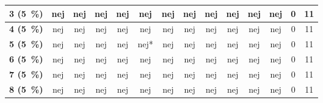 \begin{longtable} {l|c|c|c|c|c|c|c|c|c|c|c|c|c}
\cellcolor[HTML]{C0C0C0}\textbf{3   (5~\%)}	 & \cellcolor[HTML]{ECF4FF} nej	& \cellcolor[HTML]{ECF4FF}nej &	\cellcolor[HTML]{ECF4FF}nej &\cellcolor[HTML]{ECF4FF} nej	& \cellcolor[HTML]{ECF4FF}nej &	\cellcolor[HTML]{ECF4FF}nej	& \cellcolor[HTML]{ECF4FF}nej & \cellcolor[HTML]{ECF4FF}nej	& \cellcolor[HTML]{ECF4FF}nej	& \cellcolor[HTML]{ECF4FF}nej	& \cellcolor[HTML]{ECF4FF}nej & \cellcolor[HTML]{EFEFEF}0 & \cellcolor[HTML]{EFEFEF}11\\ \hline 
\cellcolor[HTML]{C0C0C0}\textbf{4    (5~\%)}	 & \cellcolor[HTML]{ECF4FF} nej	& \cellcolor[HTML]{ECF4FF}nej &	\cellcolor[HTML]{ECF4FF}nej &\cellcolor[HTML]{ECF4FF} nej	& \cellcolor[HTML]{ECF4FF}nej &	\cellcolor[HTML]{ECF4FF}nej	& \cellcolor[HTML]{ECF4FF}nej & \cellcolor[HTML]{ECF4FF}nej	& \cellcolor[HTML]{ECF4FF}nej	& \cellcolor[HTML]{ECF4FF}nej	& \cellcolor[HTML]{ECF4FF}nej & \cellcolor[HTML]{EFEFEF}0 & \cellcolor[HTML]{EFEFEF}11\\ \hline 
\cellcolor[HTML]{C0C0C0}\textbf{5    (5~\%)}	 & \cellcolor[HTML]{ECF4FF} nej	& \cellcolor[HTML]{ECF4FF}nej &	\cellcolor[HTML]{ECF4FF}nej &\cellcolor[HTML]{ECF4FF} nej	& \cellcolor[HTML]{ECF4FF}nej* &	\cellcolor[HTML]{ECF4FF}nej	& \cellcolor[HTML]{ECF4FF}nej & \cellcolor[HTML]{ECF4FF}nej	& \cellcolor[HTML]{ECF4FF}nej	& \cellcolor[HTML]{ECF4FF}nej	& \cellcolor[HTML]{ECF4FF}nej & \cellcolor[HTML]{EFEFEF}0 & \cellcolor[HTML]{EFEFEF}11\\ \hline 
\cellcolor[HTML]{C0C0C0}\textbf{6    (5~\%)}	 & \cellcolor[HTML]{ECF4FF} nej	& \cellcolor[HTML]{ECF4FF}nej &	\cellcolor[HTML]{ECF4FF}nej &\cellcolor[HTML]{ECF4FF} nej	& \cellcolor[HTML]{ECF4FF}nej &	\cellcolor[HTML]{ECF4FF}nej	& \cellcolor[HTML]{ECF4FF}nej & \cellcolor[HTML]{ECF4FF}nej	& \cellcolor[HTML]{ECF4FF}nej	& \cellcolor[HTML]{ECF4FF}nej	& \cellcolor[HTML]{ECF4FF}nej & \cellcolor[HTML]{EFEFEF}0 & \cellcolor[HTML]{EFEFEF}11\\ \hline 
\cellcolor[HTML]{C0C0C0}\textbf{7    (5~\%)}	 & \cellcolor[HTML]{ECF4FF} nej	& \cellcolor[HTML]{ECF4FF}nej &	\cellcolor[HTML]{ECF4FF}nej &\cellcolor[HTML]{ECF4FF} nej	& \cellcolor[HTML]{ECF4FF}nej &	\cellcolor[HTML]{ECF4FF}nej	& \cellcolor[HTML]{ECF4FF}nej & \cellcolor[HTML]{ECF4FF}nej	& \cellcolor[HTML]{ECF4FF}nej	& \cellcolor[HTML]{ECF4FF}nej	& \cellcolor[HTML]{ECF4FF}nej & \cellcolor[HTML]{EFEFEF}0 & \cellcolor[HTML]{EFEFEF}11\\ \hline 
\cellcolor[HTML]{C0C0C0}\textbf{8    (5~\%)}	 & \cellcolor[HTML]{ECF4FF} nej	& \cellcolor[HTML]{ECF4FF}nej &	\cellcolor[HTML]{ECF4FF}nej &\cellcolor[HTML]{ECF4FF} nej	& \cellcolor[HTML]{ECF4FF}nej &	\cellcolor[HTML]{ECF4FF}nej	& \cellcolor[HTML]{ECF4FF}nej & \cellcolor[HTML]{ECF4FF}nej	& \cellcolor[HTML]{ECF4FF}nej	& \cellcolor[HTML]{ECF4FF}nej	& \cellcolor[HTML]{ECF4FF}nej & \cellcolor[HTML]{EFEFEF}0 & \cellcolor[HTML]{EFEFEF}11\\ \hline 

\end{longtable}
